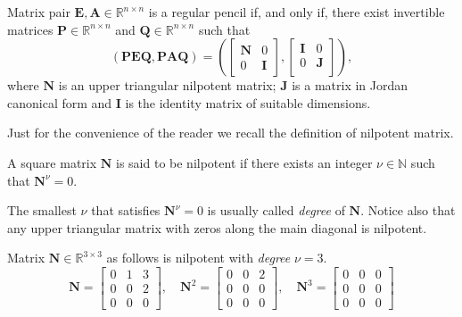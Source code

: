 		\begin{theorem}
			Matrix pair $\bm{E},\bm{A}\in\mathbb{R}^{n\times n}$ is a 
			regular pencil if, and only if, there exist invertible matrices
			$\bm{P}\in\mathbb{R}^{n\times n}$ and $\bm{Q}\in\mathbb{R}^{n\times n}$ such that
			\begin{equation}
			\label{eq:weierstrassform}
				(\bm{PEQ},\bm{PAQ}) = \left(
					\begin{bmatrix}
						\bm{N} & 0 \\
						0 & \bm{I}
					\end{bmatrix},
					\begin{bmatrix}
					 	\bm{I} & 0 \\
					 	0 & \bm{J} \\
					\end{bmatrix}
				\right),
			\end{equation}
			where $\bm{N}$ is an upper triangular nilpotent matrix; 
			$\bm{J}$ is a matrix in Jordan canonical form and $\bm{I}$ is
			the identity matrix of suitable dimensions.
		\end{theorem}
		Just for the convenience of the reader we recall the definition of nilpotent matrix.
		\begin{definition}
			A square matrix $\bm{N}$ is said to be nilpotent if there exists 
			an integer $\nu\in\mathbb{N}$ such that $\bm{N}^{\nu} = 0$.
		\end{definition}
		\begin{remark}
			The smallest $\nu$ that satisfies $\bm{N}^{\nu} = 0$ is usually
			called \emph{degree} of $\bm{N}$.
			Notice also that any upper triangular matrix with zeros
			along the main diagonal is nilpotent.
		\end{remark}
		\begin{example}
			Matrix $\bm{N}\in\mathbb{R}^{3\times 3}$ as 
			follows is nilpotent with \emph{degree} $\nu = 3$.
			\begin{equation}
				\bm{N} = 
				\begin{bmatrix}
					0 & 1 & 3 \\
					0 & 0 & 2 \\
					0 & 0 & 0
				\end{bmatrix}, \quad
				\bm{N}^2 = 
				\begin{bmatrix}
					0 & 0 & 2 \\
					0 & 0 & 0 \\
					0 & 0 & 0
				\end{bmatrix}, \quad 
				\bm{N}^3 =
				\begin{bmatrix}
					0 & 0 & 0 \\
					0 & 0 & 0 \\
					0 & 0 & 0 
				\end{bmatrix}
			\end{equation}
		\end{example}
